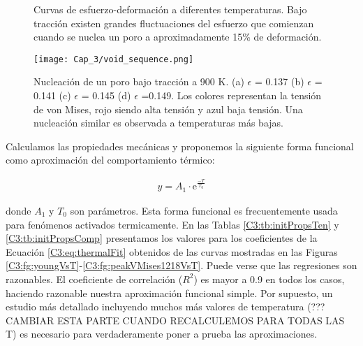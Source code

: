 
\begin{figure}[htp]
\centering
{}
\caption[Curvas de esfuerzo-deformación a diferentes temperaturas.]{Curvas de esfuerzo-deformación a diferentes temperaturas. Bajo tracción existen grandes fluctuaciones del esfuerzo que comienzan cuando se nuclea un poro a aproximadamente 15\% de deformación.}
\label{C3:fg:sStrain}
\end{figure}

\begin{figure}[htp]
\centering
\texttt{[image: Cap\_3/void\_sequence.png]}
\caption[Nucleación de un poro bajo tracción a 900 K.]{Nucleación de un poro bajo tracción a 900 K. (a) $\epsilon$ = 0.137 (b) $\epsilon$ = 0.141 (c) $\epsilon$ = 0.145 (d) $\epsilon$ =0.149. Los colores representan la tensión de von Mises, rojo siendo alta tensión y azul baja tensión. Una nucleación similar es observada a temperaturas más bajas.}
\label{C3:fg:voidSeq}
\end{figure}

Calculamos las propiedades mecánicas y proponemos la siguiente forma funcional como aproximación del comportamiento térmico:


\begin{eqnarray}
y = A_{1}\cdot \mathrm{e}^{\frac{-T}{T_{0}}}
\label{C3:eq:thermalFit}
\end{eqnarray}

donde $A_{1}$ y $T_{0}$ son parámetros. Esta forma funcional es frecuentemente usada para fenómenos activados termicamente. En las Tablas \ref{C3:tb:initPropsTen} y \ref{C3:tb:initPropsComp} presentamos los valores para los coeficientes de la Ecuación \ref{C3:eq:thermalFit} obtenidos de las curvas mostradas en las Figuras \ref{C3:fg:youngVsT}-\ref{C3:fg:peakVMises1218VsT}. Puede verse que las regresiones son razonables. El coeficiente de correlación ($R^2$) es mayor a 0.9 en todos los casos, haciendo razonable nuestra aproximación funcional simple. Por supuesto, un estudio más detallado incluyendo muchos más valores de temperatura (??? CAMBIAR ESTA PARTE CUANDO RECALCULEMOS PARA TODAS LAS T) es necesario para verdaderamente poner a prueba las aproximaciones.
	
